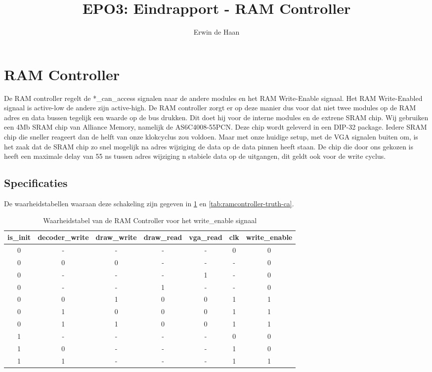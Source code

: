 \documentclass{scrreprt} %
\author{Erwin de Haan}%
\title{EPO3: Eindrapport - RAM Controller}
\begin{document}
\section{RAM Controller} %
\label{sec:ram-controller} %

De RAM controller regelt de *\_can\_access signalen naar de andere modules en het RAM Write-Enable signaal. Het RAM Write-Enabled signaal is active-low de andere zijn active-high.
De RAM controller zorgt er op deze manier dus voor dat niet twee modules op de RAM adres en data bussen tegelijk een waarde op de bus drukken.
Dit doet hij voor de interne modules en de extrene SRAM chip.
Wij gebruiken een 4Mb SRAM chip van Alliance Memory, namelijk de AS6C4008-55PCN. 
Deze chip wordt geleverd in een DIP-32 package.
Iedere SRAM chip die sneller reageert dan de helft van onze klokcyclus zou voldoen.
Maar met onze huidige setup, met de VGA signalen buiten om, is het zaak dat de SRAM chip zo snel mogelijk na adres wijziging de data op de data pinnen heeft staan.
De chip die door ons gekozen is heeft een maximale delay van 55 ns tussen adres wijziging n stabiele data op de uitgangen, dit geldt ook voor de write cyclus.



\subsection{Specificaties}
De waarheidstabellen waaraan deze schakeling zijn gegeven in \ref{tab:ramcontroller-truth-re} en \ref{tab:ramcontroller-truth-ca}.

\begin{table}[H]
\centering
\caption{Waarheidstabel van de RAM Controller voor het write\_enable signaal}
\label{tab:ramcontroller-truth-re}
\begin{tabular}{c c c c c c | c}
	\hline\hline
 	is\_init & decoder\_write & draw\_write & draw\_read & vga\_read & clk & write\_enable\\
 	\hline	
	0 & - & - & - & - & 0 & 0\\
	0 & 0 & 0 & - & - & - & 0\\
	0 & - & - & - & 1 & - & 0\\
	0 & - & - & 1 & - & - & 0\\
	0 & 0 & 1 & 0 & 0 & 1 & 1\\
	0 & 1 & 0 & 0 & 0 & 1 & 1\\
	0 & 1 & 1 & 0 & 0 & 1 & 1\\
	1 & - & - & - & - & 0 & 0\\
	1 & 0 & - & - & - & 1 & 0\\
	1 & 1 & - & - & - & 1 & 1\\
  	\hline
\end{tabular}
\end{table}
\end{document}
